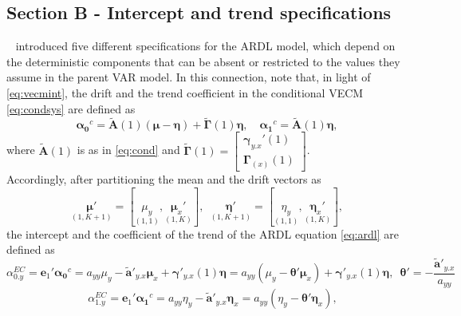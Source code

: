 \subsection{Section B - Intercept and trend specifications}\label{sec:appendixb}
 ~\citet{pesaran2001} introduced five different specifications for the ARDL model, which depend on the deterministic components that can be absent or restricted to the values they assume in the parent VAR model. In this connection, note that, in light of \eqref{eq:vecmint}, the drift and the trend coefficient in the conditional VECM \eqref{eq:condsys} are defined as
\begin{equation}
\boldsymbol{\alpha_{0}}^{c}=\widetilde{\mathbf{A}}(1)(\boldsymbol{\mu}-\boldsymbol{\eta})+\widetilde{\boldsymbol{\Gamma}}(1)\boldsymbol{\eta} , \enspace \enspace 
\boldsymbol{\alpha_{1}}^{c}=\widetilde{\mathbf{A}}(1)\boldsymbol{\eta}, 
\end{equation}
where $\widetilde{\mathbf{A}}(1)$ is as in \eqref{eq:cond} and $\widetilde{\boldsymbol{\Gamma}}(1)=\begin{bmatrix} \boldsymbol{\gamma}_{y.x}'(1) \\ \boldsymbol{\Gamma}_{(x)}(1) \end{bmatrix}$.\\
Accordingly, after partitioning the  mean and the drift vectors as 
\begin{equation}
\underset{(1,K+1)}{\boldsymbol{\mu}'}=[\underset{(1,1)}{\mu_{y}},\underset{(1,K)}{\boldsymbol{\mu}_x'}], \enspace \underset{(1,K+1)}{\boldsymbol{\eta}'}=[\underset{(1,1)}{\eta_{y}},\underset{(1,K)}{\boldsymbol{\eta}_{x}'}], 
\end{equation}
the intercept and the coefficient of the trend of the ARDL equation \eqref{eq:ardl} are defined as
\begin{equation}
\alpha_{0.y}^{EC}
= \mathbf{e}_{1}'\boldsymbol{\alpha_{0}}^{c}
=a_{yy}\mu_{y}-\widetilde{\mathbf{a}}'_{y.x}\boldsymbol{\mu}_{x}+\boldsymbol{\gamma}'_{y.x}(1)\boldsymbol{\eta}=a_{yy}(\mu_{y}-\boldsymbol{\theta}'\boldsymbol{\mu}_{x})+\boldsymbol{\gamma}'_{y.x}(1)\boldsymbol{\eta}, \enspace 
\boldsymbol{\theta}'=-\frac{\widetilde{\mathbf{a}}'_{y.x}}{a_{yy}}
\end{equation}
\begin{equation}
\enspace \enspace \alpha_{1.y}^{EC}=\mathbf{e}_{1}'\boldsymbol{\alpha_{1}}^{c}=
a_{yy}\eta_{y}-\widetilde{\mathbf{a}}'_{y.x}\boldsymbol{\eta}_{x}=a_{yy}(\eta_{y}-\boldsymbol{\theta'}\boldsymbol{\eta}_{x}),
\end{equation}
